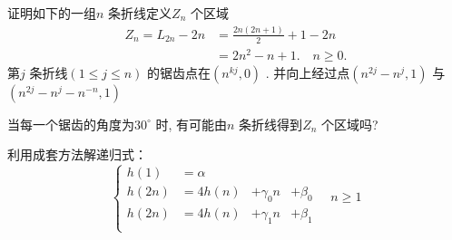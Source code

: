 \begin{exercise}
	证明如下的一组$ n $ 条折线定义$ Z_n $ 个区域
	\begin{equation}
		\begin{aligned}
			Z_n = L_{2n}-2n &= \frac{2n(2n+1)}{2}+1-2n \\
			&=2n^2-n+1. \quad n\geqslant 0.
		\end{aligned}
	\end{equation}
	第$ j $ 条折线$ (1\leqslant j\leqslant n) $ 的锯齿点在$ (n^{kj},0) $ . 并向上经过点$ (n^{2j}-n^j,1) $ 与 $ (n^{2j}-n^j-n^{-n}, 1) $ 
\end{exercise}

\begin{answer}
	
\end{answer}

\begin{exercise}
	当每一个锯齿的角度为$ 30^{\circ} $ 时, 有可能由$ n $ 条折线得到$ Z_n $ 个区域吗?
\end{exercise}

\begin{answer}
	
\end{answer}

\begin{exercise}
	利用成套方法解递归式：
	\begin{equation*}
		\left\{
			\begin{array}{llll}
				h(1) &= \alpha &&\\
				h(2n) &= 4h(n) &+\gamma_0 n&+\beta_0\\
				h(2n) &= 4h(n) &+\gamma_1 n&+\beta_1\\
			\end{array}
		\right.\quad n\geqslant 1
	\end{equation*}
\end{exercise}

